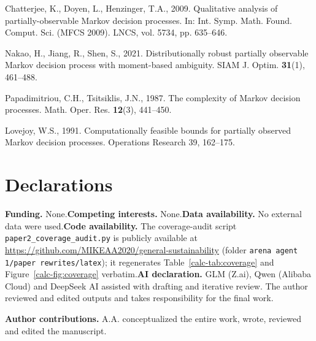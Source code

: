 \documentclass[10pt,twocolumn]{article}
\theoremstyle{definition}
\begin{document}
{Chatterjee, K., Doyen, L., Henzinger, T.A., 2009. Qualitative analysis
of partially-observable Markov decision processes. In: Int. Symp. Math.
Found. Comput. Sci. (MFCS 2009). LNCS, vol. 5734, pp. 635--646.

Nakao, H., Jiang, R., Shen, S., 2021. Distributionally robust partially
observable Markov decision process with moment-based ambiguity. SIAM J.
Optim. \textbf{31}(1), 461--488.

Papadimitriou, C.H., Tsitsiklis, J.N., 1987. The complexity of Markov
decision processes. Math. Oper. Res. \textbf{12}(3), 441--450.

Lovejoy, W.S., 1991. Computationally feasible bounds for partially
observed Markov decision processes. Operations Research 39, 162--175.
}

\section*{Declarations}

\textbf{Funding.} None.\quad \textbf{Competing interests.} None.\quad \textbf{Data availability.} No external data were used.\quad \textbf{Code availability.} The coverage-audit script \texttt{paper2\_coverage\_audit.py} is publicly available at \url{https://github.com/MIKEAA2020/general-sustainability} (folder \texttt{arena agent 1/paper rewrites/latex}); it regenerates Table~\ref{calc-tab:coverage} and Figure~\ref{calc-fig:coverage} verbatim.\quad \textbf{AI declaration.} GLM (Z.ai), Qwen (Alibaba Cloud) and DeepSeek AI assisted with drafting and iterative review. The author reviewed and edited outputs and takes
responsibility for the final work.

\textbf{Author contributions.} A.A. conceptualized the entire work, wrote, reviewed and edited the manuscript.
\end{document}
